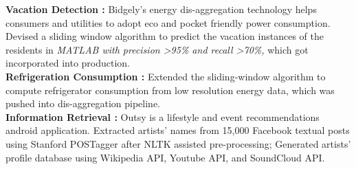 \documentclass[11pt,a4paper,sans]{moderncv}        %
\begin{document}
\vspace{-2mm}
{\textbf{Vacation Detection : }Bidgely's energy dis-aggregation technology helps consumers and utilities to adopt eco and pocket friendly power consumption. Devised a sliding window algorithm to predict the vacation instances of the residents in \textit{MATLAB with precision \textgreater95\% and recall \textgreater70\%,} which got incorporated into production.
\vspace{4} \\ 
\textbf{Refrigeration Consumption : }Extended the sliding-window algorithm to compute refrigerator consumption from low resolution energy data, which was pushed into dis-aggregation pipeline. \\}
\vspace{-2mm}
{\textbf{Information Retrieval : }Outsy is a lifestyle and event recommendations android application. Extracted artists' names from 15,000 Facebook textual posts using Stanford POSTagger after NLTK assisted pre-processing; Generated artists' profile database using Wikipedia API, Youtube API, and SoundCloud API.}
\vspace{-1} \\ 
\end{document}
